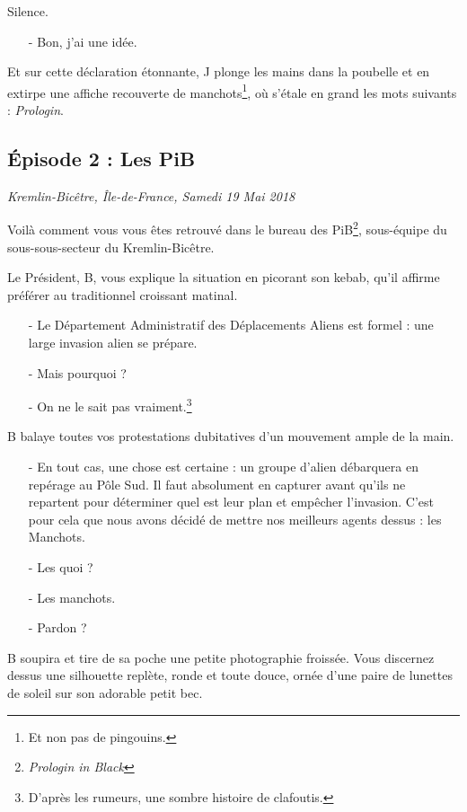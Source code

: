 Silence.

\begin{itemize}
\item[-] Bon, j'ai une idée.
\end{itemize}

Et sur cette déclaration étonnante, J plonge les mains dans la poubelle et en
extirpe une affiche recouverte de manchots\footnote{Et non pas de pingouins.},
où s'étale en grand les mots suivants : \emph{Prologin}.

\subsection{Épisode 2 : Les PiB}
\hfill \textit{Kremlin-Bicêtre, Île-de-France, Samedi 19 Mai 2018}

Voilà comment vous vous êtes retrouvé dans le bureau des
PiB\footnote{\emph{Prologin in Black}\texttrademark}, sous-équipe du
sous-sous-secteur du Kremlin-Bicêtre.

Le Président, B, vous explique la situation en picorant son kebab, qu'il affirme
préférer au traditionnel croissant matinal.

\begin{itemize}
    \item[-] Le Département Administratif des Déplacements Aliens est formel :
        une large invasion alien se prépare.
    \item[-] Mais pourquoi ?
    \item[-] On ne le sait pas vraiment.\footnote{D'après les rumeurs, une
        sombre histoire de clafoutis.}
\end{itemize}
B balaye toutes vos protestations dubitatives d'un mouvement ample de la main.
\begin{itemize}
    \item[-] En tout cas, une chose est certaine : un groupe d'alien débarquera
        en repérage au Pôle Sud. Il faut absolument en capturer avant qu'ils ne
        repartent pour déterminer quel est leur plan et empêcher l'invasion.
        C'est pour cela que nous avons décidé de mettre nos meilleurs agents
        dessus : les Manchots.
    \item[-] Les quoi ?
    \item[-] Les manchots.
    \item[-] Pardon ?
\end{itemize}

B soupira et tire de sa poche une petite photographie froissée. Vous discernez
dessus une silhouette replète, ronde et toute douce, ornée d'une paire de
lunettes de soleil sur son adorable petit bec.

